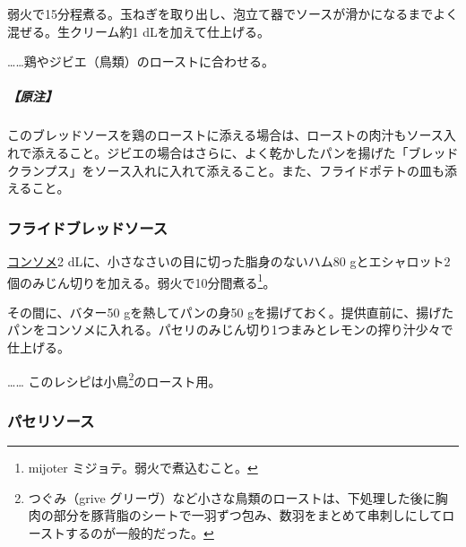 \begin{recette}
弱火で15分程煮る。玉ねぎを取り出し、泡立て器でソースが滑かになるまでよく混ぜる。生クリーム約1
dLを加えて仕上げる。

\ldots{}\ldots{}鶏やジビエ（鳥類）のローストに合わせる。

\hypertarget{nota-bread-sauce}{%
\subparagraph{【原注】}\label{nota-bread-sauce}}

このブレッドソースを鶏のローストに添える場合は、ローストの肉汁もソース入れで添えること。ジビエの場合はさらに、よく乾かしたパンを揚げた「ブレッドクランプス」をソース入れに入れて添えること。また、フライドポテトの皿も添えること。

\hypertarget{fried-bread-sauce}{%
\subsubsection{フライドブレッドソース}\label{fried-bread-sauce}}



\protect\hyperlink{}{コンソメ}2
dLに、小さなさいの目に切った脂身のないハム80
gとエシャロット2個のみじん切りを加える。弱火で10分間煮る\footnote{mijoter
  ミジョテ。弱火で煮込むこと。}。

その間に、バター50 gを熱してパンの身50
gを揚げておく。提供直前に、揚げたパンをコンソメに入れる。パセリのみじん切り1つまみとレモンの搾り汁少々で仕上げる。

\ldots{}\ldots{} このレシピは小鳥\footnote{つぐみ（grive
  グリーヴ）など小さな鳥類のローストは、下処理した後に胸肉の部分を豚背脂のシートで一羽ずつ包み、数羽をまとめて串刺しにしてローストするのが一般的だった。}のロースト用。

\hypertarget{perseley-sauce}{%
\subsubsection{パセリソース}\label{perseley-sauce}}



\end{recette}
